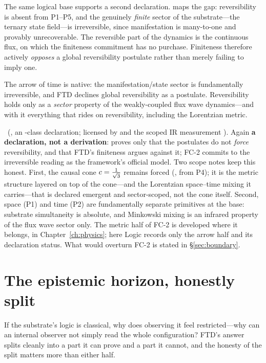 The same logical base supports a second declaration.  maps the gap:
reversibility is absent from P1--P5, and the genuinely \emph{finite} sector of
the substrate---the ternary state field---is irreversible, since manifestation
is many-to-one and provably unrecoverable. The reversible part of the dynamics
is the continuous flux, on which the finiteness commitment has no purchase.
Finiteness therefore actively \emph{opposes} a global reversibility postulate
rather than merely failing to imply one.

\begin{conditionalbox}
The arrow of time is native: the manifestation/state sector is fundamentally
irreversible, and FTD declines global reversibility as a postulate.
Reversibility holds only as a \emph{sector} property of the weakly-coupled flux
wave dynamics---and with it everything that rides on reversibility, including the
Lorentzian metric.
\end{conditionalbox}

\noindent
{}~(, an -class declaration; licensed by 
and the scoped IR measurement ). Again \textbf{a declaration, not a
derivation}:  proves only that the postulates do not \emph{force}
reversibility, and that FTD's finiteness argues against it; FC-2 commits to the
irreversible reading as the framework's official model. Two scope notes keep this
honest. First, the causal cone $c=\tfrac{1}{\sqrt 3}$ remains forced (, from P4); it
is the metric structure layered on top of the cone---and the Lorentzian
space--time mixing it carries---that is declared emergent and sector-scoped, not
the cone itself. Second, space (P1) and time (P2) are fundamentally separate
primitives at the base: substrate simultaneity is absolute, and Minkowski mixing
is an infrared property of the flux wave sector only. The metric half of FC-2 is
developed where it belongs, in Chapter~\ref{ch:physics}; here Logic records only
the arrow half and its declaration status. What would overturn FC-2 is stated in
\S\ref{sec:boundary}.

\section{The epistemic horizon, honestly split}\label{sec:horizon}

If the substrate's logic is classical, why does observing it feel
restricted---why can an internal observer not simply read the whole
configuration? FTD's answer splits cleanly into a part it can prove and a part
it cannot, and the honesty of the split matters more than either half.

